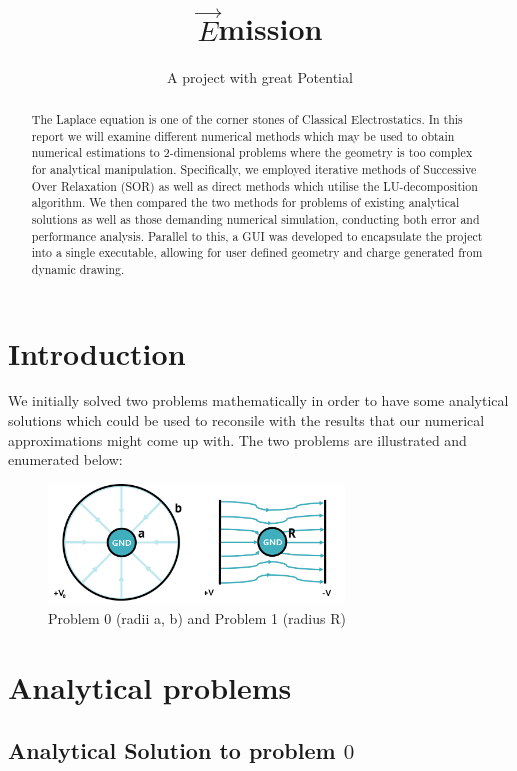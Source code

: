 \documentclass[a4paper]{article}
\title{$\vec{E}$mission}
\author{A project with great Potential} %
\begin{document}
\maketitle

\begin{abstract}
The Laplace equation is one of the corner stones of Classical Electrostatics. In this report we will examine different numerical methods which may be used to obtain numerical estimations to 2-dimensional problems where the geometry is too complex for analytical manipulation. Specifically, we employed iterative methods of Successive Over Relaxation (SOR) as well as direct methods which utilise the LU-decomposition algorithm. We then compared the two methods for problems of existing analytical solutions as well as those demanding numerical simulation, conducting both error and performance analysis. Parallel to this, a GUI was developed to encapsulate the project into a single executable, allowing for user defined geometry and charge generated from dynamic drawing.
\end{abstract}

\section{Introduction}

We initially solved two problems mathematically in order to have some analytical solutions which could be used to reconsile with the results that our numerical approximations might come up with. The two problems are illustrated and enumerated below:

\begin{figure}[h]
\centering
\includegraphics[width=0.7\textwidth]{AnalProblems.png}
\caption{\label{fig:frog}Problem 0 (radii a, b) and Problem 1 (radius R)}
\end{figure}

\section{Analytical problems}

\subsection{Analytical Solution to problem $0$}
\end{document}
